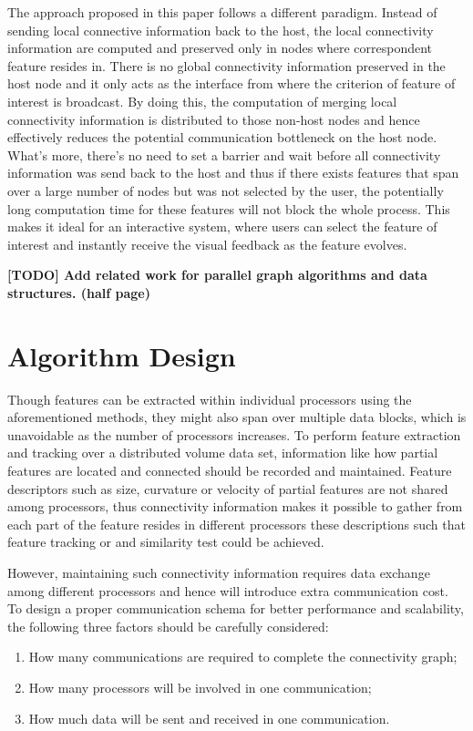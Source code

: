 \documentclass[10pt, conference, compsocconf]{IEEEtran}
\begin{document}
The approach proposed in this paper follows a different paradigm. Instead of sending local connective information back to the host, the local connectivity information are computed and preserved only in nodes where correspondent feature resides in. There is no global connectivity information preserved in the host node and it only acts as the interface from where the criterion of feature of interest is broadcast. By doing this, the computation of merging local connectivity information is distributed to those non-host nodes and hence effectively reduces the potential communication bottleneck on the host node. What's more, there's no need to set a barrier and wait before all connectivity information was send back to the host and thus if there exists features that span over a large number of nodes but was not selected by the user, the potentially long computation time for these features will not block the whole process. This makes it ideal for an interactive system, where users can select the feature of interest and instantly receive the visual feedback as the feature evolves.

\textbf{[TODO] Add related work for parallel graph algorithms and data structures. (half page)}

\section{Algorithm Design}
Though features can be extracted within individual processors using the aforementioned methods, they might also span over multiple data blocks, which is unavoidable as the number of processors increases. To perform feature extraction and tracking over a distributed volume data set, information like how partial features are located and connected should be recorded and maintained. Feature descriptors such as size, curvature or velocity of partial features are not shared among processors, thus connectivity information makes it possible to gather from each part of the feature resides in different processors these descriptions such that feature tracking or and similarity test could be achieved. 

However, maintaining such connectivity information requires data exchange among different processors and hence will introduce extra communication cost. To design a proper communication schema for better performance and scalability, the following three factors should be carefully considered:

\begin{enumerate}
\item How many communications are required to complete the connectivity graph;
\item How many processors will be involved in one communication;
\item How much data will be sent and received in one communication.
\end{enumerate}
\end{document}
